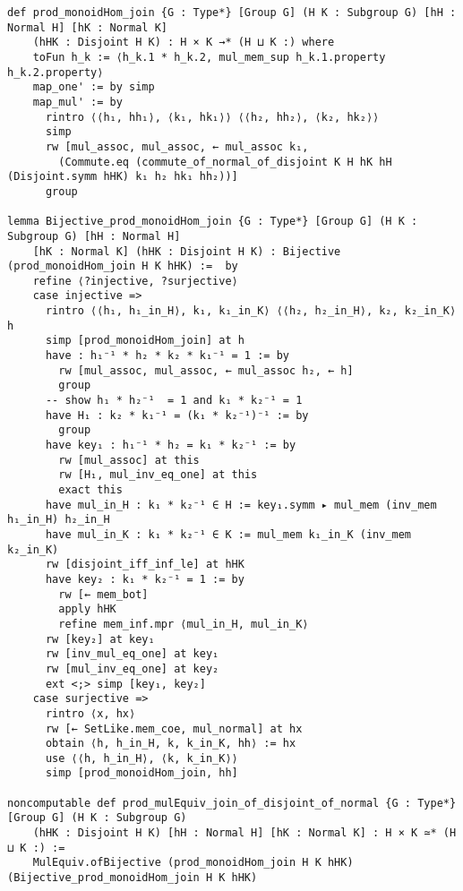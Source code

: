 \begin{footnotesize}
\begin{verbatim}
def prod_monoidHom_join {G : Type*} [Group G] (H K : Subgroup G) [hH : Normal H] [hK : Normal K]
    (hHK : Disjoint H K) : H × K →* (H ⊔ K :) where
    toFun h_k := ⟨h_k.1 * h_k.2, mul_mem_sup h_k.1.property h_k.2.property⟩
    map_one' := by simp
    map_mul' := by
      rintro ⟨⟨h₁, hh₁⟩, ⟨k₁, hk₁⟩⟩ ⟨⟨h₂, hh₂⟩, ⟨k₂, hk₂⟩⟩
      simp
      rw [mul_assoc, mul_assoc, ← mul_assoc k₁,
        (Commute.eq (commute_of_normal_of_disjoint K H hK hH (Disjoint.symm hHK) k₁ h₂ hk₁ hh₂))]
      group
    
lemma Bijective_prod_monoidHom_join {G : Type*} [Group G] (H K : Subgroup G) [hH : Normal H]
    [hK : Normal K] (hHK : Disjoint H K) : Bijective (prod_monoidHom_join H K hHK) :=  by
    refine ⟨?injective, ?surjective⟩
    case injective =>
      rintro ⟨⟨h₁, h₁_in_H⟩, k₁, k₁_in_K⟩ ⟨⟨h₂, h₂_in_H⟩, k₂, k₂_in_K⟩ h
      simp [prod_monoidHom_join] at h
      have : h₁⁻¹ * h₂ * k₂ * k₁⁻¹ = 1 := by
        rw [mul_assoc, mul_assoc, ← mul_assoc h₂, ← h]
        group
      -- show h₁ * h₂⁻¹  = 1 and k₁ * k₂⁻¹ = 1
      have H₁ : k₂ * k₁⁻¹ = (k₁ * k₂⁻¹)⁻¹ := by
        group
      have key₁ : h₁⁻¹ * h₂ = k₁ * k₂⁻¹ := by
        rw [mul_assoc] at this
        rw [H₁, mul_inv_eq_one] at this
        exact this
      have mul_in_H : k₁ * k₂⁻¹ ∈ H := key₁.symm ▸ mul_mem (inv_mem h₁_in_H) h₂_in_H
      have mul_in_K : k₁ * k₂⁻¹ ∈ K := mul_mem k₁_in_K (inv_mem k₂_in_K)
      rw [disjoint_iff_inf_le] at hHK
      have key₂ : k₁ * k₂⁻¹ = 1 := by
        rw [← mem_bot]
        apply hHK
        refine mem_inf.mpr ⟨mul_in_H, mul_in_K⟩
      rw [key₂] at key₁
      rw [inv_mul_eq_one] at key₁
      rw [mul_inv_eq_one] at key₂
      ext <;> simp [key₁, key₂]
    case surjective =>
      rintro ⟨x, hx⟩
      rw [← SetLike.mem_coe, mul_normal] at hx
      obtain ⟨h, h_in_H, k, k_in_K, hh⟩ := hx
      use ⟨⟨h, h_in_H⟩, ⟨k, k_in_K⟩⟩
      simp [prod_monoidHom_join, hh]
  
noncomputable def prod_mulEquiv_join_of_disjoint_of_normal {G : Type*} [Group G] (H K : Subgroup G)
    (hHK : Disjoint H K) [hH : Normal H] [hK : Normal K] : H × K ≃* (H ⊔ K :) :=
    MulEquiv.ofBijective (prod_monoidHom_join H K hHK) (Bijective_prod_monoidHom_join H K hHK)
\end{verbatim}
\end{footnotesize}

